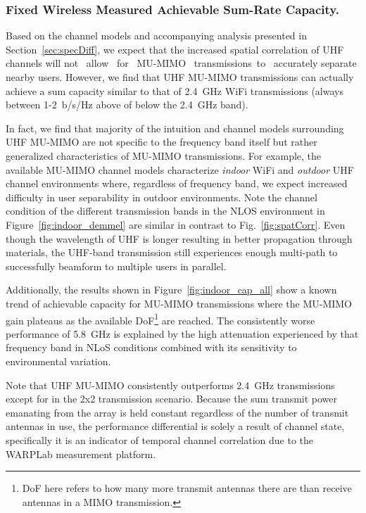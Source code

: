       
\subsubsection{Fixed Wireless Measured Achievable Sum-Rate Capacity.}

Based on the channel models and accompanying analysis presented in Section~\ref{sec:specDiff}, we expect that the increased spatial correlation of UHF channels will not \  allow \ for \ MU-MIMO \ transmissions\ to \ accurately separate nearby users.
However, we find that UHF \ac{MU-MIMO} transmissions can actually achieve a sum capacity similar to that of 2.4~GHz WiFi transmissions (always between 1-2~b/s/Hz above of below the 2.4~GHz band).

In fact, we find that majority of the intuition and channel models surrounding UHF MU-MIMO are not specific to the frequency band itself but rather generalized characteristics of MU-MIMO transmissions.
For example, the available MU-MIMO channel models characterize \textit{indoor} WiFi and \textit{outdoor} UHF channel environments where, regardless of frequency band, we expect increased difficulty in user separability in outdoor environments.  
Note the channel condition of the different transmission bands in the NLOS environment in Figure~\ref{fig:indoor_demmel} are similar in contrast to Fig.~\ref{fig:spatCorr}.  
Even though the wavelength of UHF is longer resulting in better propagation through materials, the UHF-band transmission still experiences enough multi-path to successfully beamform to multiple users in parallel.



Additionally, the results shown in Figure~\ref{fig:indoor_cap_all} show a known trend of achievable capacity for MU-MIMO transmissions where the MU-MIMO gain plateaus as the available \ac{DoF}\footnote{\ac{DoF} here refers to how many more transmit antennas there are than receive antennas in a MIMO transmission.} are reached.
The consistently worse performance of 5.8~GHz is explained by the high attenuation experienced by that frequency band in \ac{NLoS} conditions combined with its sensitivity to environmental variation.    

Note that UHF MU-MIMO consistently outperforms 2.4~GHz transmissions except for in the 2x2 transmission scenario.  
Because the sum transmit power emanating from the array is held constant regardless of the number of transmit antennas in use, the performance differential is solely a result of channel state, specifically it is an indicator of temporal channel correlation due to the WARPLab measurement platform.


